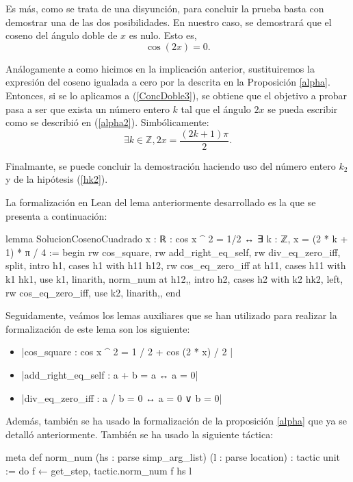 \begin{demostracion}
    Es más, como se trata de una disyunción, para concluir la
    prueba basta con demostrar una de las dos posibilidades.
    En nuestro caso, se demostrará que el coseno del ángulo doble
    de \(x\) es nulo. Esto es,
    \begin{equation}\label{ConcDoble3}
      \cos(2x)=0.
    \end{equation}

    Análogamente a como hicimos en la implicación anterior,
    sustituiremos la expresión del coseno igualada a cero por la
    descrita en la Proposición \ref{alpha}. Entonces, si se lo
    aplicamos a (\ref{ConcDoble3}), se obtiene que el objetivo
    a probar pasa a ser que exista un número entero \(k\) tal que
    el ángulo \(2x\) se pueda escribir como se describió en
    (\ref{alpha2}). Simbólicamente:
    \begin{equation}
      ∃k∈ ℤ, 2x=\frac{(2k+1)π}{2}.
    \end{equation}

    Finalmante, se puede concluir la demostración haciendo uso del
    número entero \(k_2\) y de la hipótesis (\ref{hk2}). 
    \end{demostracion}

La formalización en Lean del lema anteriormente desarrollado es
la que se presenta a continuación:
\begin{leancode}
lemma SolucionCosenoCuadrado {x : ℝ} : cos x ^ 2 = 1/2 ↔
∃ k : ℤ, x = (2 * k + 1) * π / 4 :=
begin
  rw cos_square,
  rw add_right_eq_self,
  rw div_eq_zero_iff,
  split,
  {intro h1,
  cases h1 with h11 h12,
  rw cos_eq_zero_iff at h11,
  cases h11 with k1 hk1,
  use k1,
  linarith,
  norm_num at h12,},
  {intro h2, 
  cases h2 with k2 hk2,
  left,
  rw cos_eq_zero_iff,
  use k2,
  linarith,},
end
\end{leancode}

Seguidamente, veámos los lemas auxiliares que se han utilizado
para realizar la formalización de este lema son los siguiente:
\begin{itemize}
\item {}|cos_square : cos x ^ 2 = 1 / 2 + cos (2 * x) / 2 |
\item {}|add_right_eq_self : a + b = a ↔ a = 0|
\item {}|div_eq_zero_iff : a / b = 0 ↔ a = 0 ∨ b = 0|
\end{itemize}

Además, también se ha usado la formalización de la proposición
\ref{alpha} que ya se detalló anteriormente. También se ha usado
la siguiente táctica:
\begin{leancode}
meta def norm_num (hs : parse simp_arg_list) (l : parse location) :
tactic unit :=
do f ← get_step, tactic.norm_num f hs l
\end{leancode}

